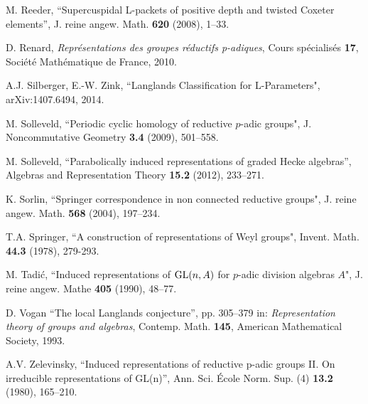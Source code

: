 \documentclass[11pt]{amsart}
\theoremstyle{definition}
\def\GL{{\rm GL}}
\begin{document}
\begin{thebibliography}{99}
 M. Reeder, ``Supercuspidal L-packets of positive depth and 
twisted Coxeter elements'',
J. reine angew. Math. {\bf 620} (2008), 1--33.

 D. Renard,
\emph{Repr\'esentations des groupes r\'eductifs p-adiques},
Cours sp\'ecialis\'es {\bf 17}, Soci\'et\'e Math\'ematique de France, 2010.

 A.J. Silberger, E.-W. Zink,
``Langlands Classification for L-Parameters",
arXiv:1407.6494, 2014.

 M. Solleveld,
``Periodic cyclic homology of reductive $p$-adic groups",
J. Noncommutative Geometry {\bf 3.4} (2009), 501--558.

 M. Solleveld,
``Parabolically induced representations of graded Hecke algebras'',
Algebras and Representation Theory {\bf 15.2} (2012), 233--271.

 K. Sorlin,
``Springer correspondence in non connected reductive groups",
J. reine angew. Math. {\bf 568} (2004), 197--234.

 T.A. Springer,
``A construction of representations of Weyl groups",
Invent. Math. {\bf 44.3} (1978), 279-293.

 M. Tadi\'c,
``Induced representations of $\GL(n,A)$ for $p$-adic division algebras $A$",
J. reine angew. Mathe {\bf 405} (1990), 48--77.

 D. Vogan	
``The local Langlands conjecture'',
pp. 305--379 in: \emph{Representation theory of groups and algebras},
Contemp. Math. {\bf 145}, American Mathematical Society, 1993. 

 A.V. Zelevinsky,         
``Induced representations of reductive p-adic groups II. 
On irreducible representations of GL(n)'',
Ann. Sci. \'Ecole Norm. Sup. (4) {\bf 13.2} (1980), 165--210.

\end{thebibliography}
\end{document}
